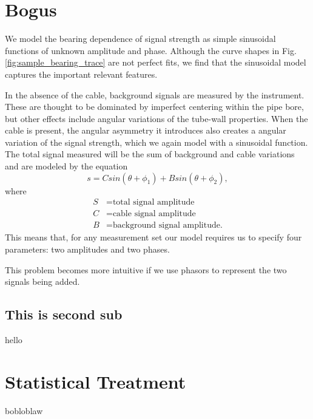 \documentclass[paper=a4, fontsize=11pt]{scrartcl}
\numberwithin{equation}{section}		%
\numberwithin{figure}{section}			%
\numberwithin{table}{section}				%
\begin{document}
\begin{appendices}
\section{Bogus}

We model the bearing dependence of signal strength as simple sinusoidal functions of unknown amplitude and phase.  Although the curve shapes in Fig. \ref{fig:sample_bearing_trace} are not perfect fits, we find that the sinusoidal model captures the important relevant features.
\par In the absence of the cable, background signals are measured by the instrument.  These are thought to be dominated by imperfect centering within the pipe bore, but other effects include angular variations of the tube-wall properties.  When the cable is present, the angular asymmetry it introduces also creates a angular variation of the signal strength, which we again model with a sinusoidal function.  The total signal measured will be the sum of background and cable variations and are modeled by the equation
\begin{equation} \label{eq:trig_sig}
    s = C sin\left(\theta + \phi_1\right) + B sin\left(\theta + \phi_2\right),
\end{equation}
where
\begin{align}
        S &= \text{total signal amplitude} \\
        C &= \text{cable signal amplitude} \\
        B &= \text{background signal amplitude.}
\end{align}
This means that, for any measurement set our model requires us to specify four parameters: two amplitudes and two phases.  \par This problem becomes more intuitive if we use phasors to represent the two signals being added.





\subsection{This is second sub}
hello
\section{Statistical Treatment}
bobloblaw
\end{appendices}




\end{document}
